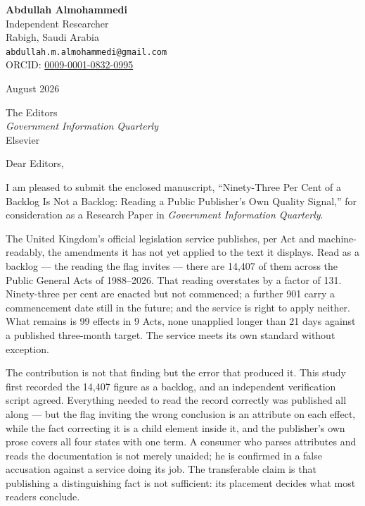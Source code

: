 \documentclass[10.5pt]{letter}
\begin{document}
\noindent
{\large\textbf{Abdullah Almohammedi}}\\
Independent Researcher\\
Rabigh, Saudi Arabia\\
\texttt{abdullah.m.almohammedi@gmail.com}\\
ORCID: \href{https://orcid.org/0009-0001-0832-0995}{0009-0001-0832-0995}

\vspace{0.8em}
 August 2026

\vspace{0.8em}
\noindent The Editors\\
\emph{Government Information Quarterly}\\
Elsevier

\vspace{0.9em}
\noindent Dear Editors,

\vspace{0.6em}
I am pleased to submit the enclosed manuscript, ``Ninety-Three Per Cent of a
Backlog Is Not a Backlog: Reading a Public Publisher's Own Quality Signal,''
for consideration as a Research Paper in \emph{Government Information
Quarterly}.

\vspace{0.5em}
The United Kingdom's official legislation service publishes, per Act and
machine-readably, the amendments it has not yet applied to the text it
displays. Read as a backlog --- the reading the flag invites --- there are
14,407 of them across the Public General Acts of 1988--2026. That reading
overstates by a factor of 131. Ninety-three per cent are enacted but not
commenced; a further 901 carry a commencement date still in the future; and
the service is right to apply neither. What remains is 99 effects in 9 Acts,
none unapplied longer than 21 days against a published three-month target. The
service meets its own standard without exception.

\vspace{0.5em}
The contribution is not that finding but the error that produced it. This study
first recorded the 14,407 figure as a backlog, and an independent verification
script agreed. Everything needed to read the record correctly was published all
along --- but the flag inviting the wrong conclusion is an attribute on each
effect, while the fact correcting it is a child element inside it, and the
publisher's own prose covers all four states with one term. A consumer who
parses attributes and reads the documentation is not merely unaided; he is
confirmed in a false accusation against a service doing its job. The
transferable claim is that publishing a distinguishing fact is not sufficient:
its placement decides what most readers conclude.
\end{document}
